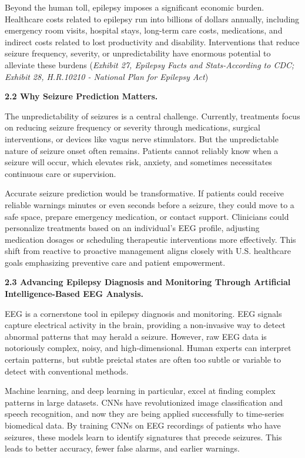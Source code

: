 \documentclass{article}
\begin{document}
Beyond the human toll, epilepsy imposes a significant economic burden. Healthcare costs related to epilepsy run into billions of dollars annually, including emergency room visits, hospital stays, long-term care costs, medications, and indirect costs related to lost productivity and disability. Interventions that reduce seizure frequency, severity, or unpredictability have enormous potential to alleviate these burdens  ({\it Exhibit 27, Epilepsy Facts and Stats-According to CDC; \it Exhibit 28, H.R.10210 - National Plan for Epilepsy Act})


{\bf 2.2 Why Seizure Prediction Matters. }

The unpredictability of seizures is a central challenge. Currently, treatments focus on reducing seizure frequency or severity through medications, surgical interventions, or devices like vagus nerve stimulators. But the unpredictable nature of seizure onset often remains. Patients cannot reliably know when a seizure will occur, which elevates risk, anxiety, and sometimes necessitates continuous care or supervision.

Accurate seizure prediction would be transformative. If patients could receive reliable warnings minutes or even seconds before a seizure, they could move to a safe space, prepare emergency medication, or contact support. Clinicians could personalize treatments based on an individual’s EEG profile, adjusting medication dosages or scheduling therapeutic interventions more effectively. This shift from reactive to proactive management aligns closely with U.S. healthcare goals emphasizing preventive care and patient empowerment.

{\bf 2.3 Advancing Epilepsy Diagnosis and Monitoring Through Artificial Intelligence-Based EEG Analysis. }

EEG is a cornerstone tool in epilepsy diagnosis and monitoring. EEG signals capture electrical activity in the brain, providing a non-invasive way to detect abnormal patterns that may herald a seizure. However, raw EEG data is notoriously complex, noisy, and high-dimensional. Human experts can interpret certain patterns, but subtle preictal states are often too subtle or variable to detect with conventional methods.

Machine learning, and deep learning in particular, excel at finding complex patterns in large datasets. CNNs have revolutionized image classification and speech recognition, and now they are being applied successfully to time-series biomedical data. By training CNNs on EEG recordings of patients who have seizures, these models learn to identify signatures that precede seizures. This leads to better accuracy, fewer false alarms, and earlier warnings.
\end{document}
